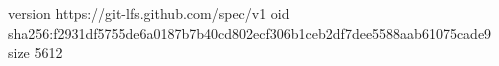version https://git-lfs.github.com/spec/v1
oid sha256:f2931df5755de6a0187b7b40cd802ecf306b1ceb2df7dee5588aab61075cade9
size 5612
